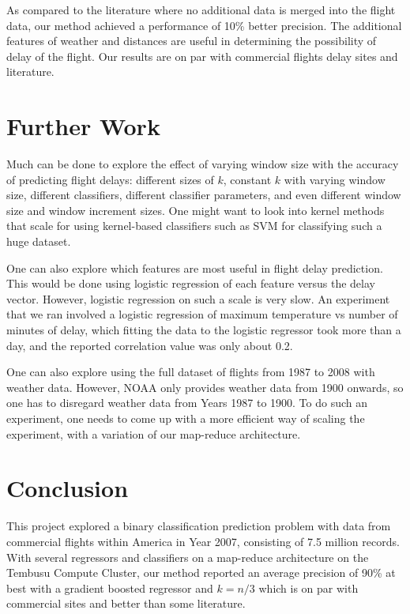 \documentclass[letterpaper,11pt]{article}
\begin{document}
As compared to the literature where no additional data is merged into the flight data, our method achieved a performance of 10\% better precision. The additional features of weather and distances are useful in determining the possibility of delay of the flight. Our results are on par with commercial flights delay sites and literature. 

\section{Further Work}
Much can be done to explore the effect of varying window size with the accuracy of predicting flight delays: different sizes of $k$, constant $k$ with varying window size, different classifiers, different classifier parameters, and even different window size and window increment sizes. One might want to look into kernel methods that scale for using kernel-based classifiers such as SVM for classifying such a huge dataset. 

One can also explore which features are most useful in flight delay prediction. This would be done using logistic regression of each feature versus the delay vector. However, logistic regression on such a scale is very slow. An experiment that we ran involved a logistic regression of maximum temperature vs number of minutes of delay, which fitting the data to the logistic regressor took more than a day, and the reported correlation value was only about 0.2. 

One can also explore using the full dataset of flights from 1987 to 2008 with weather data. However, NOAA only provides weather data from 1900 onwards, so one has to disregard weather data from Years 1987 to 1900. To do such an experiment, one needs to come up with a more efficient way of scaling the experiment, with a variation of our map-reduce architecture.

\section{Conclusion}
This project explored a binary classification prediction problem with data from commercial flights within America in Year 2007, consisting of 7.5 million records. With several regressors and classifiers on a map-reduce architecture on the Tembusu Compute Cluster, our method reported an average precision of 90\% at best with a gradient boosted regressor and $k=n/3$ which is on par with commercial sites and better than some literature.



\end{document}
